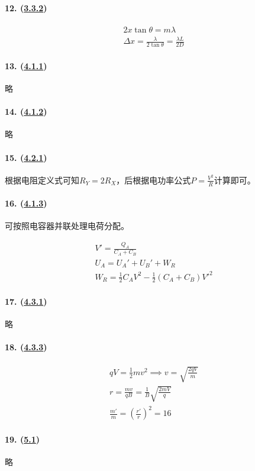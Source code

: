 \paragraph{12. (\hyperref[subsec:3.3.2]{3.3.2})}

\begin{gather*}
    2x\tan\theta=m\lambda\\
    \Delta x=\frac{\lambda}{2\tan\theta}=\frac{\lambda L}{2D}
\end{gather*}

\paragraph{13. (\hyperref[subsec:4.1.1]{4.1.1})} 略
\paragraph{14. (\hyperref[subsec:4.1.2]{4.1.2})} 略
\paragraph{15. (\hyperref[subsec:4.2.1]{4.2.1})} 根据电阻定义式可知$R_Y=2R_X$，后根据电功率公式$P=\frac{V^2}{R}$计算即可。
\paragraph{16. (\hyperref[subsec:4.1.3]{4.1.3})} 可按照电容器并联处理电荷分配。

\begin{gather*}
    V'=\frac{Q_A}{C_A+C_B}\\
    U_A=U_A'+U_B'+W_R\\
    W_R=\frac12C_AV^2-\frac12(C_A+C_B)V'^2
\end{gather*}

\paragraph{17. (\hyperref[subsec:4.3.1]{4.3.1})} 略
\paragraph{18. (\hyperref[subsec:4.3.3]{4.3.3})}

\begin{gather*}
    qV=\frac12mv^2\implies v=\sqrt{\frac{2qV}{m}}\\
    r=\frac{mv}{qB}=\frac1B\sqrt{\frac{2mV}{q}}\\
    \frac{m'}{m}=\left(\frac{r'}{r}\right)^2=16
\end{gather*}

\paragraph{19. (\hyperref[sec:5.1]{5.1})} 略
